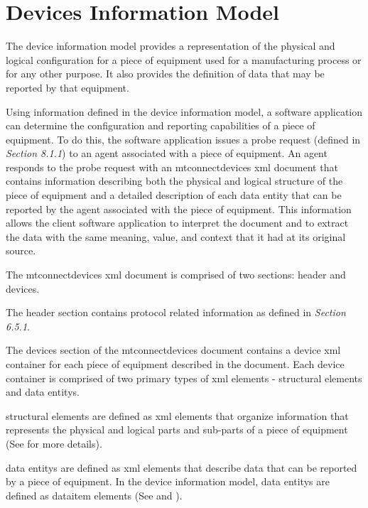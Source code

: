\section{Devices Information Model}
\label{sec:Devices Information Model}
The \gls{device information model} provides a representation of the physical and logical configuration for a piece of equipment used for a manufacturing process or for any other purpose.  It also provides the definition of data that may be reported by that equipment. 

Using information defined in the \gls{device information model}, a software application can determine the configuration and reporting capabilities of a piece of equipment.  To do this, the software application issues a \gls{probe request} (defined in  \textit{Section 8.1.1}) to an \gls{agent} associated with a piece of equipment. An \gls{agent} responds to the \gls{probe request} with an \gls{mtconnectdevices} \gls{xml} document that contains information describing both the physical and logical structure of the piece of equipment and a detailed description of each \gls{data entity} that can be reported by the \gls{agent} associated with the piece of equipment.   This information allows the client software application to interpret the document and to extract the data with the same meaning, value, and context that it had at its original source.  

The \gls{mtconnectdevices} \gls{xml} document is comprised of two sections: \gls{header} and \gls{devices}.

The \gls{header} section contains protocol related information as defined in  \textit{Section 6.5.1}.

The \gls{devices} section of the \gls{mtconnectdevices} document contains a \gls{device} \gls{xml} container for each piece of equipment described in the document.   Each \gls{device} container is comprised of two primary types of \gls{xml} elements - \glspl{structural element} and \glspl{data entity}.  

\glspl{structural element} are defined as \gls{xml} elements that organize information that represents the physical and logical parts and sub-parts of a piece of equipment (See  for more details).  

\glspl{data entity} are defined as \gls{xml} elements that describe data that can be reported by a piece of equipment.  In the \gls{device information model}, \glspl{data entity} are defined as \gls{dataitem} elements (See  and ).

